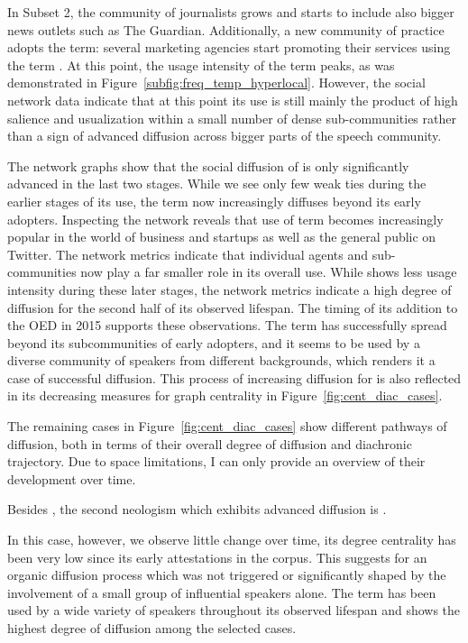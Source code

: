 \documentclass[
  a4paper,
  abstract=on,
  captions=tableabove
  ]{scrartcl}
\begin{document}
      In Subset 2, the community of journalists grows and starts to include also bigger news outlets such as The Guardian. Additionally, a new community of practice adopts the term: several marketing agencies start promoting their services using the term . At this point, the usage intensity of the term peaks, as was demonstrated in Figure~\ref{subfig:freq_temp_hyperlocal}. However, the social network data indicate that at this point its use is still mainly the product of high salience and usualization within a small number of dense sub-communities rather than a sign of advanced diffusion across bigger parts of the speech community.

      The network graphs show that the social diffusion of  is only significantly advanced in the last two stages. While we see only few weak ties during the earlier stages of its use, the term now increasingly diffuses beyond its early adopters. Inspecting the network reveals that use of term becomes increasingly popular in the world of business and startups as well as the general public on Twitter. The network metrics indicate that individual agents and sub-communities now play a far smaller role in its overall use. While  shows less usage intensity during these later stages, the network metrics indicate a high degree of diffusion for the second half of its observed lifespan. The timing of its addition to the OED in 2015 supports these observations. The term  has successfully spread beyond its subcommunities of early adopters, and it seems to be used by a diverse community of speakers from different backgrounds, which renders it a case of successful diffusion. This process of increasing diffusion for  is also reflected in its decreasing measures for graph centrality in Figure~\ref{fig:cent_diac_cases}.

      The remaining cases in Figure~\ref{fig:cent_diac_cases} show different pathways of diffusion, both in terms of their overall degree of diffusion and diachronic trajectory. Due to space limitations, I can only provide an overview of their development over time.
      
      Besides , the second neologism which exhibits advanced diffusion is .
      
      In this case, however, we observe little change over time, its degree centrality has been very low since its early attestations in the corpus. This suggests for an organic diffusion process which was not triggered or significantly shaped by the involvement of a small group of influential speakers alone. The term  has been used by a wide variety of speakers throughout its observed lifespan and shows the highest degree of diffusion among the selected cases.
\end{document}
